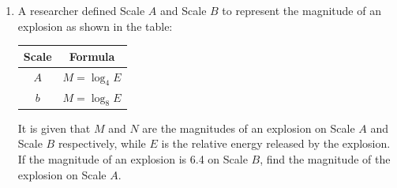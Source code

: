 \documentclass[11pt]{article}
\begin{document}
\begin{enumerate}
            \hrulefill
            
            \hrulefill
            
            \hrulefill
            
            \hrulefill
            
            \hrulefill
            
            \hrulefill
            
            \hrulefill
            
            \hrulefill
            
            \hrulefill

        \pagebreak
        \item A researcher defined Scale $A$ and Scale $B$ to represent the magnitude of an explosion as shown in the table:
        \begin{center}
            \begin{tabular}{ |c|c| }
                \hline
                Scale&Formula\\
                \hline
                $A$&$M=\log_4{E}$\\
                \hline
                $b$&$M=\log_8{E}$\\
                \hline
            \end{tabular}
        \end{center}
        It is given that $M$ and $N$ are the magnitudes of an explosion on Scale $A$ and Scale $B$ respectively, while $E$ is the relative energy released by the explosion. If the magnitude of an explosion is 6.4 on Scale $B$, find the magnitude of the explosion on Scale $A$.

        \hrulefill
            
            \hrulefill
            
            \hrulefill
            
            \hrulefill
            
            \hrulefill
            
            \hrulefill
            
            \hrulefill
            
            \hrulefill
            
            \hrulefill
            
            \hrulefill

            \hrulefill
            
            \hrulefill
            

\end{enumerate}
\end{document}
